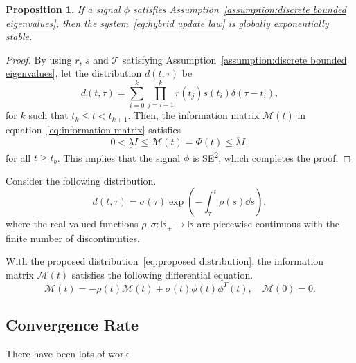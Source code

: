 \documentclass[]{IEEEtran}
\newtheorem{proposition}{Proposition}
\theoremstyle{definition}
\theoremstyle{remark}
\newcommand{\MB}[1]{\mathbb{#1}}
\newcommand{\MC}[1]{\mathcal{#1}}
\begin{document}
\begin{proposition}
	If a signal $\phi$ satisfies Assumption~\ref{assumption:discrete bounded
	eigenvalues}, then the system~\eqref{eq:hybrid update law} is globally
	exponentially stable.
\end{proposition}

\begin{proof}
	By using $r$, $s$ and $\MC{T}$ satisfying
	Assumption~\ref{assumption:discrete bounded eigenvalues}, let the
	distribution $d(t, \tau)$ be
	\begin{equation*}
		d(t, \tau) = \sum_{i=0}^k \prod_{j=i+1}^k r(t_j) s(t_i) \delta(\tau - t_i),
	\end{equation*}
	for $k$ such that $t_k \le t < t_{k+1}$. Then, the information matrix
	$\MC{M}(t)$ in equation~\eqref{eq:information matrix} satisfies
	\begin{equation*}
		0 < \underline{\lambda} I \le \MC{M}(t) = \Phi(t) \le \overline{\lambda} I,
	\end{equation*}
	for all $t \ge t_b$. This implies that the signal $\phi$ is
	SE\textsuperscript{2}, which completes the proof.
\end{proof}

Consider the following distribution.
\begin{equation}\label{eq:proposed distribution}
	d(t, \tau) = \sigma(\tau) \exp( -\int_\tau^t \rho(s) \dd{s} ),
\end{equation}
where the real-valued functions $\rho, \sigma : \MB{R}_{+} \to \MB{R}$ are
piecewise-continuous with the finite number of discontinuities.

% 

With the proposed distribution~\eqref{eq:proposed distribution}, the
information matrix $\MC{M}(t)$ satisfies the following differential equation.
\begin{equation}
	\dot{\MC{M}}(t) = - \rho(t) \MC{M}(t) + \sigma(t) \phi(t) \phi^T(t), \quad
	\MC{M}(0) = 0.
\end{equation}



\subsection{Convergence Rate}

There have been lots of work 






\end{document}
